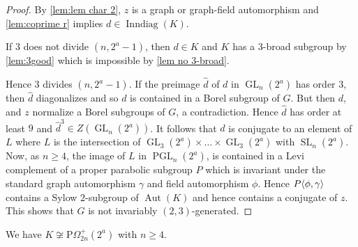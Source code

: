 \documentclass[12pt,a4paper]{amsart}
\DeclareMathOperator{\Aut}{Aut}
\DeclareMathOperator{\Inndiag}{Inndiag}
\DeclareMathOperator{\GL}{GL}
\DeclareMathOperator{\PGL}{PGL}
\DeclareMathOperator{\SL}{SL}
\newcommand{\wh}{\widehat}
\DeclarePairedDelimiter{\gen}{\langle}{\rangle}
\begin{document}
\begin{proof} By \cref{lem:lem char 2}, $z$ is a graph or  graph-field automorphism and \cref{lem:coprime r} implies $d\in \Inndiag(K)$.

If $3$ does not divide  $(n,2^a-1)$, then $d \in K$ and $K$ has a $3$-broad subgroup by \cref{lem:3good} which is impossible by \cref{lem no 3-broad}.

Hence $3$  divides $(n,2^a-1)$. If the preimage $\wh d$  of $d$ in $\GL_n(2^a)$ has order $3$, then $\wh d$ diagonalizes and so $d$ is contained in a Borel subgroup of $G$. But then $d$, and $z$ normalize a Borel  subgroups of $G$, a contradiction.  Hence $\wh d$ has order at least $9$ and $\wh {d}^3 \in Z(\GL_n(2^a))$.  It follows that $\wh d$ is conjugate to an element of  $L$ where $L$ is the intersection of $\GL_3(2^a) \times \dots\times \GL_3(2^a)$ with $ \SL_n(2^a)$. Now, as $n \ge 4$, the image of  $L$ in $\PGL_n(2^a)$, is contained in a Levi complement of a proper parabolic subgroup $P$  which is invariant under the standard graph automorphism
$\gamma$ and field automorphism $\phi$. Hence $P\gen{\phi,\gamma}$ contains a Sylow $2$-subgroup of $\Aut(K)$ and hence contains a conjugate of $z$.
  This shows that $G$ is not invariably $(2,3)$-generated.
\end{proof}




\begin{lemma}\label{lem:not Omega char 2}
We have $K \not \cong \mathrm P\Omega_{2n}^+(2^a)$ with $n \ge 4$.
\end{lemma}
\end{document}
